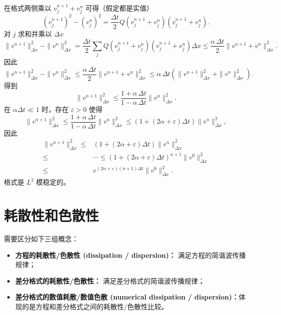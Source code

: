 \begin{solution*}
    在格式两侧乘以 $v_j^{n+1} + v_j^{n}$ 可得（假定都是实值）
    \[
        (v_j^{n+1})^2 - (v_j^{n})^2 = \frac{\Delta t}2 Q(v_j^{n+1} + v_j^n)(v_j^{n+1} + v_j^{n}).
    \]
    对 $j$ 求和并乘以 $\Delta x$
    \[
        \|v^{n+1}\|_{\Delta x}^2 - \|v^{n}\|_{\Delta x}^2
        ={}
        \frac{\Delta t}{2} \sum_j Q(v_j^{n+1} + v_j^n)(v_j^{n+1} + v_j^{n}) \Delta x
        \le{}  \frac{\alpha \,\Delta t}{2} \|v^{n+1} + v^n\|_{\Delta x}^2.
    \]
    因此
    \[
        \|v^{n+1}\|_{\Delta x}^2 - \|v^{n}\|_{\Delta x}^2 \le
        \frac{\alpha \,\Delta t}{2} \|v^{n+1} + v^n\|_{\Delta x}^2
        \le \alpha \,\Delta t \left(\|v^{n+1}\|_{\Delta x}^2 + \|v^{n}\|_{\Delta x}^2\right).
    \]
    得到
    \[
        \|v^{n+1}\|_{\Delta x}^2 \le \frac{1+ \alpha \,\Delta t}{1-\alpha \, \Delta t} \|v^{n}\|_{\Delta x}^2.
    \]
    在 $\alpha \Delta t \ll 1$ 时，存在 $\varepsilon > 0$ 使得
    \[
        \|v^{n+1}\|_{\Delta x}^2 \le
        \frac{1+ \alpha \,\Delta t}{1-\alpha \, \Delta t} \|v^{n}\|_{\Delta x}^2
        \le (1 + (2\alpha +\varepsilon) \Delta t) \|v^{n}\|_{\Delta x}^2,
    \]
    因此
    \begin{align*}
        \|v^{n+1}\|_{\Delta x}^2 \le{} & (1 + (2\alpha+\varepsilon) \Delta t) \|v^{n}\|_{\Delta x}^2                  \\
        \le{}                          & \cdots \le (1 + (2\alpha+\varepsilon) \Delta t)^{n+1} \|v^{0}\|_{\Delta x}^2 \\
        \le{}                          & e^{(2\alpha+\varepsilon) (n+1)\Delta t} \|v^{0}\|_{\Delta x}^2.
    \end{align*}
    格式是 $L^2$ 模稳定的。
\end{solution*}


\section{耗散性和色散性}

需要区分如下三组概念：
\begin{itemize}
    \item \textbf{方程的耗散性/色散性 (dissipation / dispersion)：} 满足方程的简谐波传播规律；
    \item \textbf{差分格式的耗散性/色散性：} 满足差分格式的简谐波传播规律；
    \item \textbf{差分格式的数值耗散/数值色散 (numerical dissipation / dispersion)：}体现的是方程和差分格式之间的耗散性/色散性比较。
\end{itemize}

